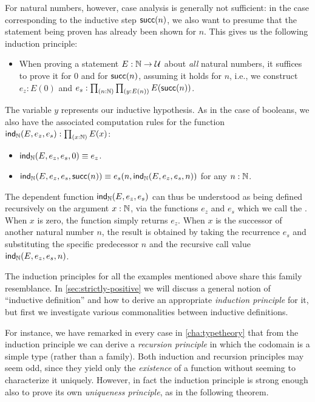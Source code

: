 %
For natural numbers, however, case analysis is generally not sufficient: in the case corresponding to the inductive step $\mathsf{succ}(n)$, we also want to presume that the statement being proven has already been shown for $n$.
This gives us the following induction principle:
\begin{itemize}
\item When proving a statement $E : \mathbb{N} \to \mathcal{U}$ about \emph{all} natural numbers, it suffices to prove it for $0$ and for $\mathsf{succ}(n)$, assuming it holds
for $n$, i.e., we construct $e_z : E(0)$ and $e_s : \prd{n : \nat}{y : E(n)} E(\suc(n))$.
\end{itemize}
The variable
%
$y$ represents our inductive hypothesis.  As in the case of booleans, we also have the associated computation rules for the function $\ind\nat(E,e_z,e_s) : \prd{x:\nat} E(x)$:
%
\begin{itemize}
\item $\mathsf{ind}_{\mathbb{N}}(E,e_z,e_s,0) \equiv e_z$.
\item $\mathsf{ind}_{\mathbb{N}}(E,e_z,e_s,\mathsf{succ}(n)) \equiv e_s(n,\mathsf{ind}_{\mathbb{N}}(E,e_z,e_s,n))$ for any $n : \mathbb{N}$.
\end{itemize}
The dependent function $\mathsf{ind}_{\mathbb{N}}(E,e_z,e_s)$ can thus be understood as being defined recursively on the argument $x : \mathbb{N}$, via the functions $e_z$ and $e_s$ which we call the .
When $x$ is zero, the function simply returns $e_z$.
When $x$ is the successor of another natural number $n$, the result is obtained by taking the recurrence $e_s$ and substituting the specific predecessor $n$ and the recursive call value $\mathsf{ind}_{\mathbb{N}}(E,e_z,e_s,n)$.

The induction principles for all the examples mentioned above share this family resemblance.
In \autoref{sec:strictly-positive} we will discuss a general notion of ``inductive definition'' and how to derive an appropriate \emph{induction principle} for it, but first we investigate various commonalities between inductive definitions.

%
For instance, we have remarked in every case in \autoref{cha:typetheory} that from the induction principle we can derive a \emph{recursion principle} in which the codomain is a simple type (rather than a family).
Both induction and recursion principles may seem odd, since they yield only the \emph{existence} of a function without seeming to characterize it uniquely.
However, in fact the induction principle is strong enough also to prove its own \emph{uniqueness principle}, as in the following theorem.

